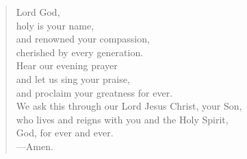 \prayer

\setlength{\vleftmargin}{\prayerleftmargini}

\begin{verse}
Lord God,\\
holy is your name,\\
and renowned your compassion,\\
cherished by every generation.\\
Hear our evening prayer\\
and let us sing your praise,\\
and proclaim your greatness for ever.\\
We ask this through our Lord Jesus Christ, your Son,\\
who lives and reigns with you and the Holy Spirit,\\
God, for ever and ever.\\
{\color{red}---\thinspace}Amen.
\end{verse}

\setlength{\vleftmargin}{\defleftmargini}